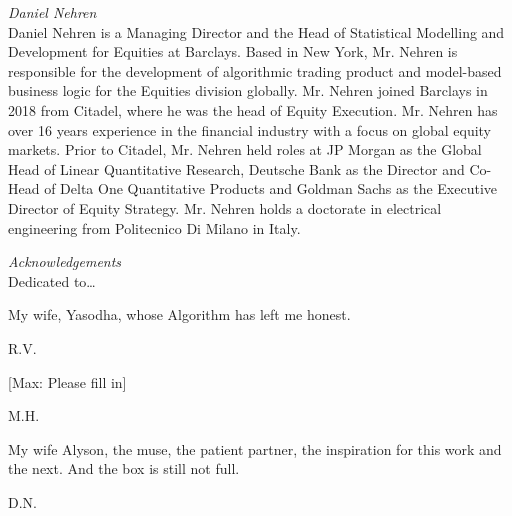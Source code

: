 {\noindent\large\itshape Daniel Nehren} \\[0.2cm]
\noindent Daniel Nehren is a Managing Director and the Head of Statistical Modelling and Development for Equities at Barclays.
Based in New York, Mr. Nehren is responsible for the development of algorithmic trading product and model-based business logic for the Equities division globally. 
Mr. Nehren joined Barclays in 2018 from Citadel, where he was the head of Equity Execution. Mr. Nehren has over 16 years experience in the financial industry with a focus on global equity markets. Prior to Citadel, Mr. Nehren held roles at JP Morgan as the Global Head of Linear Quantitative Research, Deutsche Bank as the Director and Co-Head of Delta One Quantitative Products and Goldman Sachs as the Executive Director of Equity Strategy.
Mr. Nehren holds a doctorate in electrical engineering from Politecnico Di Milano in Italy.



\newpage



{\itshape \large Acknowledgements} \\

Dedicated to\dots \\

\begin{minipage}[t]{0.8\textwidth}
	\raggedright
  	My wife, Yasodha, whose Algorithm has left me honest. \par
  	\raggedleft
  	R.V.
\end{minipage} \vspace{1cm}


\begin{minipage}[t]{0.8\textwidth}
	\raggedright
  	[Max: Please fill in] \par
  	\raggedleft
  	M.H.
\end{minipage} \vspace{1cm}


\begin{minipage}[t]{0.8\textwidth}
	\raggedright
  	My wife Alyson, the muse, the patient partner, the inspiration for this work and the next. And the box is still not full. \par
  	\raggedleft
  	D.N.
\end{minipage} 


















